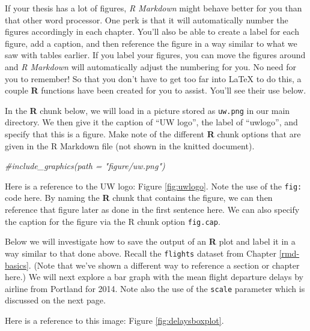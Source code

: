 \documentclass[twoside,12pt,final]{ucthesis-CA2012} %
\newenvironment{Shaded}{}{}
\newcommand{\KeywordTok}[1]{\textcolor[rgb]{0.00,0.44,0.13}{\textbf{{#1}}}}
\newcommand{\DataTypeTok}[1]{\textcolor[rgb]{0.56,0.13,0.00}{{#1}}}
\newcommand{\StringTok}[1]{\textcolor[rgb]{0.25,0.44,0.63}{{#1}}}
\newcommand{\CommentTok}[1]{\textcolor[rgb]{0.38,0.63,0.69}{\textit{{#1}}}}
\newcommand{\NormalTok}[1]{{#1}}
\newcommand{\OperatorTok}[1]{\textcolor[rgb]{0.00,0.44,0.13}{\textbf{{#1}}}}
\begin{document}
\begin{ucmainmatter}
If your thesis has a lot of figures, \emph{R Markdown} might behave
better for you than that other word processor. One perk is that it will
automatically number the figures accordingly in each chapter. You'll
also be able to create a label for each figure, add a caption, and then
reference the figure in a way similar to what we saw with tables
earlier. If you label your figures, you can move the figures around and
\emph{R Markdown} will automatically adjust the numbering for you. No
need for you to remember! So that you don't have to get too far into
LaTeX to do this, a couple \textbf{R} functions have been created for
you to assist. You'll see their use below.

In the \textbf{R} chunk below, we will load in a picture stored as
\texttt{uw.png} in our main directory. We then give it the caption of
``UW logo'', the label of ``uwlogo'', and specify that this is a figure.
Make note of the different \textbf{R} chunk options that are given in
the R Markdown file (not shown in the knitted document).
\begin{Shaded}
\begin{Highlighting}[]
\CommentTok{#include_graphics(path = "figure/uw.png")}
\end{Highlighting}
\end{Shaded}
Here is a reference to the UW logo: Figure \ref{fig:uwlogo}. Note the
use of the \texttt{fig:} code here. By naming the \textbf{R} chunk that
contains the figure, we can then reference that figure later as done in
the first sentence here. We can also specify the caption for the figure
via the R chunk option \texttt{fig.cap}.

\clearpage

Below we will investigate how to save the output of an \textbf{R} plot
and label it in a way similar to that done above. Recall the
\texttt{flights} dataset from Chapter \ref{rmd-basics}. (Note that we've
shown a different way to reference a section or chapter here.) We will
next explore a bar graph with the mean flight departure delays by
airline from Portland for 2014. Note also the use of the \texttt{scale}
parameter which is discussed on the next page.
\begin{Shaded}
\end{Shaded}
Here is a reference to this image: Figure \ref{fig:delaysboxplot}.


\end{ucmainmatter}
\end{document}
